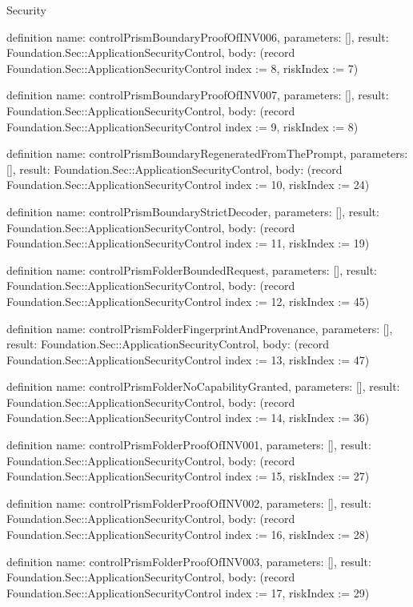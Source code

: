 \begin{lexlean}{Security}
\begin{semanticmodule}
definition{
  name: controlPrismBoundaryProofOfINV006,
  parameters: [],
  result: Foundation.Sec::ApplicationSecurityControl,
  body: (record Foundation.Sec::ApplicationSecurityControl {index := 8, riskIndex := 7})
}

definition{
  name: controlPrismBoundaryProofOfINV007,
  parameters: [],
  result: Foundation.Sec::ApplicationSecurityControl,
  body: (record Foundation.Sec::ApplicationSecurityControl {index := 9, riskIndex := 8})
}

definition{
  name: controlPrismBoundaryRegeneratedFromThePrompt,
  parameters: [],
  result: Foundation.Sec::ApplicationSecurityControl,
  body: (record Foundation.Sec::ApplicationSecurityControl {index := 10, riskIndex := 24})
}

definition{
  name: controlPrismBoundaryStrictDecoder,
  parameters: [],
  result: Foundation.Sec::ApplicationSecurityControl,
  body: (record Foundation.Sec::ApplicationSecurityControl {index := 11, riskIndex := 19})
}

definition{
  name: controlPrismFolderBoundedRequest,
  parameters: [],
  result: Foundation.Sec::ApplicationSecurityControl,
  body: (record Foundation.Sec::ApplicationSecurityControl {index := 12, riskIndex := 45})
}

definition{
  name: controlPrismFolderFingerprintAndProvenance,
  parameters: [],
  result: Foundation.Sec::ApplicationSecurityControl,
  body: (record Foundation.Sec::ApplicationSecurityControl {index := 13, riskIndex := 47})
}

definition{
  name: controlPrismFolderNoCapabilityGranted,
  parameters: [],
  result: Foundation.Sec::ApplicationSecurityControl,
  body: (record Foundation.Sec::ApplicationSecurityControl {index := 14, riskIndex := 36})
}

definition{
  name: controlPrismFolderProofOfINV001,
  parameters: [],
  result: Foundation.Sec::ApplicationSecurityControl,
  body: (record Foundation.Sec::ApplicationSecurityControl {index := 15, riskIndex := 27})
}

definition{
  name: controlPrismFolderProofOfINV002,
  parameters: [],
  result: Foundation.Sec::ApplicationSecurityControl,
  body: (record Foundation.Sec::ApplicationSecurityControl {index := 16, riskIndex := 28})
}

definition{
  name: controlPrismFolderProofOfINV003,
  parameters: [],
  result: Foundation.Sec::ApplicationSecurityControl,
  body: (record Foundation.Sec::ApplicationSecurityControl {index := 17, riskIndex := 29})
}


\end{semanticmodule}
\end{lexlean}
